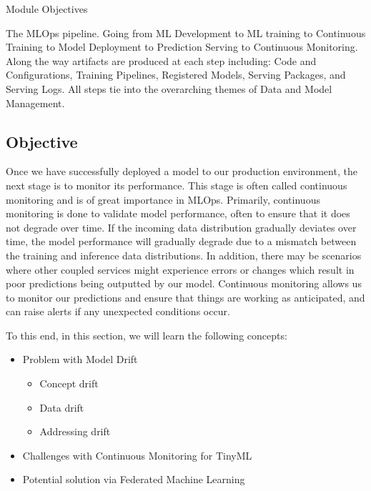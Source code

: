 {{{{{{{{    Module Objectives
    
    
    The MLOps pipeline. Going from ML Development to ML training to Continuous Training to Model Deployment to Prediction Serving to Continuous Monitoring. Along the way artifacts are produced at each step including: Code and Configurations, Training Pipelines, Registered Models, Serving Packages, and Serving Logs. All steps tie into the overarching themes of Data and Model Management.
    
    \subsection{Objective}
    
    Once we have successfully deployed a model to our production environment, the next stage is to monitor its performance. This stage is often called continuous monitoring and is of great importance in MLOps. Primarily, continuous monitoring is done to validate model performance, often to ensure that it does not degrade over time. If the incoming data distribution gradually deviates over time, the model performance will gradually degrade due to a mismatch between the training and inference data distributions. In addition, there may be scenarios where other coupled services might experience errors or changes which result in poor predictions being outputted by our model. Continuous monitoring allows us to monitor our predictions and ensure that things are working as anticipated, and can raise alerts if any unexpected conditions occur. 
    
    To this end, in this section, we will learn the following concepts:
    
    \begin{itemize}
      \item Problem with Model Drift
        \begin{itemize}
          \item Concept drift
          \item Data drift
          \item Addressing drift
        \end{itemize}
      \item Challenges with Continuous Monitoring for TinyML
      \item Potential solution via Federated Machine Learning
    \end{itemize}
    
}}}}}}}}
